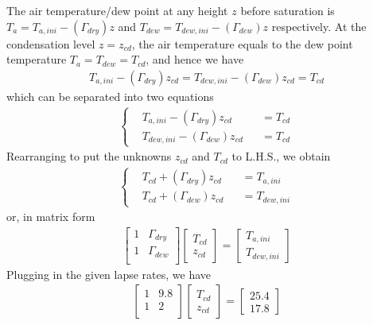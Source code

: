 \begin{Answer}
The air temperature/dew point at any height $z$ before saturation is $T_a = T_{a,ini} - (\Gamma_{dry})z$ and $T_{dew} = T_{dew, ini} - (\Gamma_{dew})z$ respectively. At the condensation level $z = z_{cd}$, the air temperature equals to the dew point temperature $T_a = T_{dew} = T_{cd}$, and hence we have
\begin{align*}
T_{a,ini} - (\Gamma_{dry})z_{cd} = T_{dew, ini} - (\Gamma_{dew})z_{cd} = T_{cd}
\end{align*}
which can be separated into two equations
\begin{align*}
\left\{\begin{alignedat}{2}
&T_{a,ini} - (\Gamma_{dry})z_{cd} & &= T_{cd} \\
&T_{dew, ini} - (\Gamma_{dew})z_{cd} & &= T_{cd}
\end{alignedat}\right.
\end{align*}
Rearranging to put the unknowns $z_{cd}$ and $T_{cd}$ to L.H.S., we obtain
\begin{align*}
\left\{\begin{alignedat}{2}
&T_{cd} + (\Gamma_{dry})z_{cd} & &= T_{a,ini}\\
&T_{cd} + (\Gamma_{dew})z_{cd} & &= T_{dew, ini} 
\end{alignedat}\right.
\end{align*}
or, in matrix form
\begin{align*}
\begin{bmatrix}
1 & \Gamma_{dry} \\
1 & \Gamma_{dew} \\
\end{bmatrix}
\begin{bmatrix}
T_{cd} \\
z_{cd}
\end{bmatrix}
=
\begin{bmatrix}
T_{a,ini} \\   
T_{dew, ini}
\end{bmatrix}
\end{align*}
Plugging in the given lapse rates, we have
\begin{align*}
\begin{bmatrix}
1 & 9.8 \\
1 & 2 \\
\end{bmatrix}
\begin{bmatrix}
T_{cd} \\
z_{cd}
\end{bmatrix}
=
\begin{bmatrix}
25.4 \\   
17.8
\end{bmatrix}
\end{align*}
\end{Answer}

